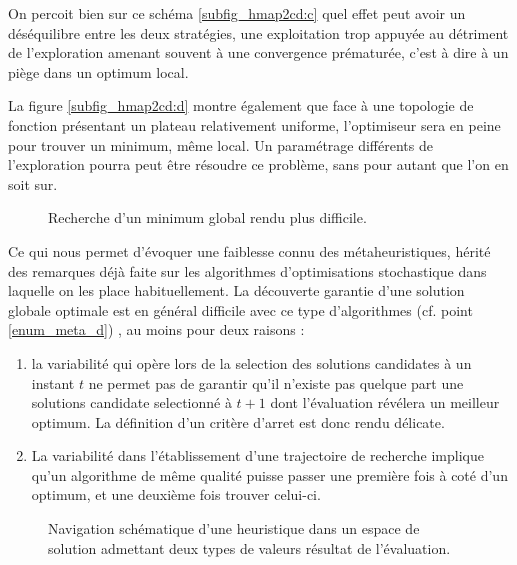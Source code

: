On percoit bien sur ce schéma \ref{subfig_hmap2cd:c} quel effet peut avoir un déséquilibre entre les deux stratégies, une exploitation trop appuyée au détriment de l'exploration amenant souvent à une convergence prématurée, c'est à dire à un piège dans un optimum local. 

La figure \ref{subfig_hmap2cd:d} montre également que face à une topologie de fonction présentant un plateau relativement uniforme, l'optimiseur sera en peine pour trouver un minimum, même local. Un paramétrage différents de l'exploration pourra peut être résoudre ce problème, sans pour autant que l'on en soit sur. 

\begin{figure}[h]
  \centering
  \qquad
  \caption{Recherche d'un minimum global rendu plus difficile.}
  \label{fig:hmap2cd}
\end{figure}

Ce qui nous permet d'évoquer une faiblesse connu des métaheuristiques, hérité des remarques déjà faite sur les algorithmes d'optimisations stochastique  dans laquelle on les place habituellement. La découverte garantie d'une solution globale optimale est en général difficile avec ce type d'algorithmes (cf. point \ref{enum_meta_d}) , au moins pour deux raisons : 

\begin{enumerate}
\item la variabilité qui opère lors de la selection des solutions candidates à un instant $t$ ne permet pas de garantir qu'il n'existe pas quelque part une solutions candidate selectionné à $t+1$ dont l'évaluation révélera un meilleur optimum. La définition d'un critère d'arret est donc rendu délicate.
\item La variabilité dans l'établissement d'une trajectoire de recherche implique qu'un algorithme de même qualité puisse passer une première fois à coté d'un optimum, et une deuxième fois trouver celui-ci. 
\end{enumerate}

\begin{figure}[h]
  \centering
  \qquad
  \caption{Navigation schématique d'une heuristique dans un espace de solution admettant deux types de valeurs résultat de l'évaluation.}
  \label{fig:hmap1}
\end{figure}

